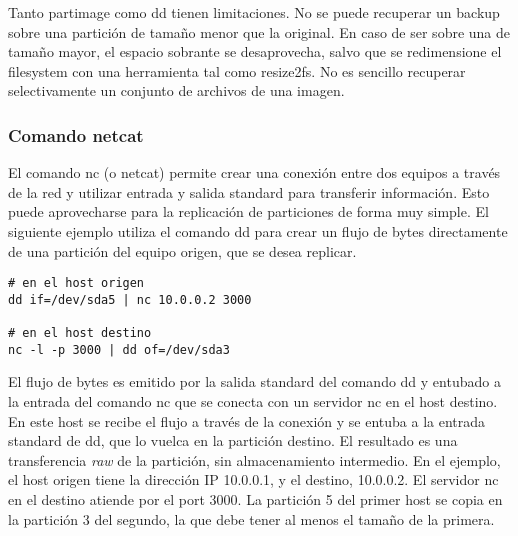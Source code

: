 Tanto partimage como dd tienen limitaciones. No se puede recuperar un backup sobre una partición de tamaño menor que la original. En caso de ser sobre una de tamaño mayor, el espacio sobrante se desaprovecha, salvo que se redimensione el filesystem con una herramienta tal como resize2fs. No es sencillo recuperar selectivamente un conjunto de archivos de una imagen.

\subsubsection{Comando netcat}

El comando nc (o netcat) permite crear una conexión entre dos equipos a través de la red y utilizar entrada y salida standard para transferir información. Esto puede aprovecharse para la replicación de particiones de forma muy simple. El siguiente ejemplo utiliza el comando dd para crear un flujo de bytes directamente de una partición del equipo origen, que se desea replicar. 

\begin{lstlisting}
# en el host origen
dd if=/dev/sda5 | nc 10.0.0.2 3000

# en el host destino
nc -l -p 3000 | dd of=/dev/sda3
\end{lstlisting}

El flujo de bytes es emitido por la salida standard del comando dd y entubado a la entrada del comando nc que se conecta con un servidor nc en el host destino. En este host se recibe el flujo a través de la conexión y se entuba a la entrada standard de dd, que lo vuelca en la partición destino. El resultado es una transferencia \emph{raw} de la partición, sin almacenamiento intermedio. En el ejemplo, el host origen tiene la dirección IP 10.0.0.1, y el destino, 10.0.0.2. El servidor nc en el destino atiende por el port 3000. La partición 5 del primer host se copia en la partición 3 del segundo, la que debe tener al menos el tamaño de la primera.

